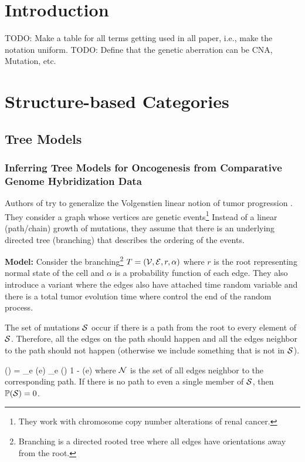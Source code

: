 \section{Introduction}
	TODO: Make a table for all terms getting used in all paper, i.e., make the notation uniform. 
	TODO: Define that the genetic aberration can be CNA, Mutation, etc. 
	
	\section{Structure-based Categories}
	
	\subsection{Tree Models}
	\subsubsection{Inferring Tree Models for Oncogenesis from Comparative Genome Hybridization Data \cite{desper99}}
	\label{oncotree}
	Authors of \cite{desper99} try to generalize the Volgenstien linear notion of tumor progression \cite{fearon90}. 
	They consider a graph whose vertices are genetic events\footnote{They work with chromosome copy number alterations of renal cancer.} 
	Instead of a linear (path/chain) growth of mutations, they assume that there is an underlying directed tree (branching) that describes the ordering of the events. 
	
	{\bf Model:}
	Consider the branching\footnote{Branching is a directed rooted tree where all edges have orientations away from the root.} $T = ({\cal V}, {\cal E}, r, \alpha)$ where $r$ is the root representing normal state of the cell and $\alpha$ is a probability function of each edge. 
	They also introduce a variant where the edges also have attached time random variable and there is a total tumor evolution time where control the end of the random process. 
	
	The set of mutations ${\cal S}$ occur if there is a path from the root to every element of ${\cal S}$. 
	Therefore, all the edges on the path should happen and all the edges neighbor to the path should not happen (otherwise we include something that is not in ${\cal S}$). 
	
	\be 
	\pr (\cS) = \prod_{e \in \cS} \alpha(e) \prod_{e \in \cN(\cS)\setminus \cS} 1 - \alpha(e)
	\ee 
	where ${\cal N}$ is the set of all edges neighbor to the corresponding path. 	
	If there is no path to even a single member of ${\cal S}$, then $\mathbb{P}({\cal S}) = 0$.
	
